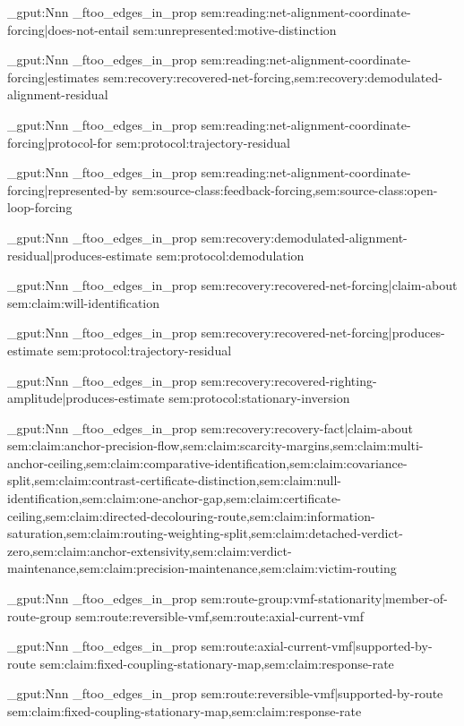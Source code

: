 \prop_gput:Nnn \g_ftoo_edges_in_prop { sem:reading:net-alignment-coordinate-forcing|does-not-entail } { sem:unrepresented:motive-distinction }

\prop_gput:Nnn \g_ftoo_edges_in_prop { sem:reading:net-alignment-coordinate-forcing|estimates } { sem:recovery:recovered-net-forcing,sem:recovery:demodulated-alignment-residual }

\prop_gput:Nnn \g_ftoo_edges_in_prop { sem:reading:net-alignment-coordinate-forcing|protocol-for } { sem:protocol:trajectory-residual }

\prop_gput:Nnn \g_ftoo_edges_in_prop { sem:reading:net-alignment-coordinate-forcing|represented-by } { sem:source-class:feedback-forcing,sem:source-class:open-loop-forcing }

\prop_gput:Nnn \g_ftoo_edges_in_prop { sem:recovery:demodulated-alignment-residual|produces-estimate } { sem:protocol:demodulation }

\prop_gput:Nnn \g_ftoo_edges_in_prop { sem:recovery:recovered-net-forcing|claim-about } { sem:claim:will-identification }

\prop_gput:Nnn \g_ftoo_edges_in_prop { sem:recovery:recovered-net-forcing|produces-estimate } { sem:protocol:trajectory-residual }

\prop_gput:Nnn \g_ftoo_edges_in_prop { sem:recovery:recovered-righting-amplitude|produces-estimate } { sem:protocol:stationary-inversion }

\prop_gput:Nnn \g_ftoo_edges_in_prop { sem:recovery:recovery-fact|claim-about } { sem:claim:anchor-precision-flow,sem:claim:scarcity-margins,sem:claim:multi-anchor-ceiling,sem:claim:comparative-identification,sem:claim:covariance-split,sem:claim:contrast-certificate-distinction,sem:claim:null-identification,sem:claim:one-anchor-gap,sem:claim:certificate-ceiling,sem:claim:directed-decolouring-route,sem:claim:information-saturation,sem:claim:routing-weighting-split,sem:claim:detached-verdict-zero,sem:claim:anchor-extensivity,sem:claim:verdict-maintenance,sem:claim:precision-maintenance,sem:claim:victim-routing }

\prop_gput:Nnn \g_ftoo_edges_in_prop { sem:route-group:vmf-stationarity|member-of-route-group } { sem:route:reversible-vmf,sem:route:axial-current-vmf }

\prop_gput:Nnn \g_ftoo_edges_in_prop { sem:route:axial-current-vmf|supported-by-route } { sem:claim:fixed-coupling-stationary-map,sem:claim:response-rate }

\prop_gput:Nnn \g_ftoo_edges_in_prop { sem:route:reversible-vmf|supported-by-route } { sem:claim:fixed-coupling-stationary-map,sem:claim:response-rate }

